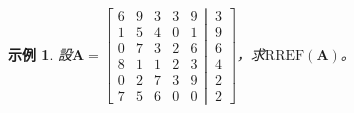 \documentclass[12pt]{article}
\newcommand{\rref}{\mathrm{RREF}}
\newtheorem*{example}{示例}
\begin{document}
    \begin{example}
        設$\mathbf{A}=\left[\begin{matrix}
            6& 9& 3& 3& 9\\
            1& 5& 4& 0& 1\\
            0& 7& 3& 2& 6\\
            8& 1& 1& 2& 3\\
            0& 2& 7& 3& 9\\
            7& 5& 6& 0& 0
        \end{matrix}
        \left|
            \,
            \begin{matrix}
            3\\9\\6\\4\\2\\2
            \end{matrix}
        \right.
        \right]$，求$\rref(\mathbf{A})$。


\end{example}
\end{document}
